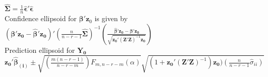 \documentclass[5pt,twocolumn]{article}
\begin{document}
	$\mathbf{\hat{\Sigma}} = \frac{1}{n}\mathbf{\hat{\epsilon}'\hat{\epsilon}}$\\
	Confidence ellipsoid for $\mathbf{\beta}'\mathbf{z}_0$ is given by\\
	\indent $(\mathbf{\beta'z_0} - \mathbf{\hat{\beta}'z_0})'\left(\frac{n}{n-r-1}\mathbf{\hat{\Sigma}}\right)^{-1}\left(\frac{\mathbf{\hat{\beta}'z_0} - \mathbf{\beta'z_0}}{\sqrt{\mathbf{z_0}'(\mathbf{Z'Z})^{-1}\mathbf{z_0}}}\right)$\\
	Prediction ellipsoid for $\mathbf{Y_0}$\\
	$\mathbf{z_0'\hat{\beta}_{(i)}} \pm \sqrt{\left(\frac{m(n-r-1)}{n-r-m}\right) F_{m, n-r-m}(\alpha)}\sqrt{(1 + \mathbf{z_0'}(\mathbf{Z'Z})^{-1})\mathbf{z_0})\left(\frac{n}{n-r-1}\hat{\sigma}_{ii}\right)}$
\end{document}
